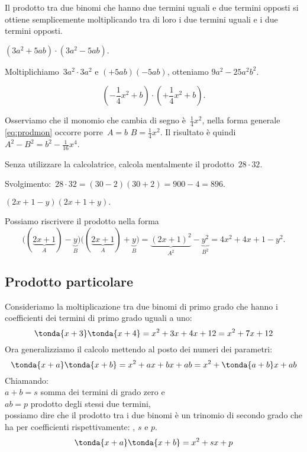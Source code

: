 \osservazione Il prodotto tra due binomi che hanno due termini
uguali e due termini opposti si ottiene semplicemente moltiplicando tra
di loro i due termini uguali e i due termini opposti.

\begin{exrig}
 \begin{esempio}
\(\left(3a^{2}+5{ab}\right)\cdot \left(3a^{2}-5{ab}\right).\)

Moltiplichiamo~\(3a^{2}\cdot 3a^{2}\) e
\(\left(+5{ab}\right)\left(-5{ab}\right)\), otteniamo
\(9a^{2}-25a^{2}b^{2}\).
 \end{esempio}

 \begin{esempio}
 \[\left(-{\frac{1}{4}}x^{2}+b\right)\cdot 
\left(+{\frac{1}{4}}x^{2}+b\right).\]

Osserviamo che il monomio che cambia di segno è~\(\frac{1}{4}x^{2}\),
nella forma generale \eqref{eq:prodmon} occorre porre~\(A=b\) 
\(B=\frac{1}{4}x^{2}\).
Il risultato è quindi~\(A^{2}-B^{2}=b^{2}-\frac{1}{16}x^{4}\).
 \end{esempio}

 \begin{esempio}
 Senza utilizzare la calcolatrice, calcola mentalmente il prodotto~\(28\cdot 
32\).

Svolgimento:~\(28\cdot 32=(30-2)(30+2)=900-4=896\).
 \end{esempio}

 \begin{esempio}
\((2x+1-y)(2x+1+y).\)

Possiamo riscrivere il prodotto nella forma
\[\big((\underbrace{2x+1}_{A})-\underbrace{y}_{B}\big)\big((\underbrace{2x+1
}_{A})+\underbrace{y}_{B}\big)=\underbrace{(2x+1)^{2}}_{A^{2}}-\underbrace{
y^{2}}_{B^{2}}=4x^{2}+4x+1-y^{2}.\]
 \end{esempio}

\end{exrig}


\subsection{Prodotto particolare}
\label{subsec:11_prodnot_particolare}

Consideriamo la moltiplicazione tra due binomi di primo grado che hanno i 
coefficienti dei termini di primo grado uguali a uno:
\[\tonda{x +3} \tonda{x+4} = x^2 +3x +4x +12 = x^2 +7x +12\]
Ora generalizziamo il calcolo mettendo al posto dei numeri dei parametri:
\[\tonda{x +a} \tonda{x+b} = x^2 +ax +bx +ab = x^2 +\tonda{a+b}x +ab\]
Chiamando:\\
\(a+b=s\) \quad somma dei termini di grado zero e\\
\(ab=p\) \quad prodotto degli stessi due termini,\\
possiamo dire che il prodotto tra i due binomi è un trinomio di secondo 
grado che ha per coefficienti rispettivamente: , \(s\) e \(p\).
\[\tonda{x +a} \tonda{x+b} = x^2 +sx +p\]

